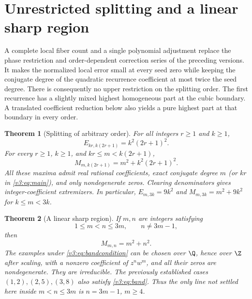 \documentclass[UTF8,11pt]{ctexart}
\newtheorem{thm}{Theorem}[section]
\theoremstyle{definition}
\numberwithin{equation}{section}
\begin{document}
\section{Unrestricted splitting and a linear sharp region}\label{v3:sec:universal}

A complete local fiber count and a single polynomial adjustment replace
the phase restriction and order-dependent correction series of the
preceding versions. It makes the normalized local error
small at every seed zero while keeping the conjugate degree of the
quadratic recurrence coefficient at most twice the seed degree.
There is consequently no upper restriction on the splitting order.
The first recurrence has a slightly mixed highest homogeneous part
at the cubic boundary. A translated coefficient reduction below
also yields a pure highest part at that boundary in every order.

\begin{thm}[Splitting of arbitrary order]\label{v3:thm:splitting}
For all integers $r\ge1$ and $k\ge1$,
\begin{equation}\label{v3:eq:main}
 E_{kr,k(2r+1)}=k^2(2r+1)^2.
\end{equation}
For every $r\ge1$, $k\ge1$, and $kr\le m<k(2r+1)$,
\begin{equation}\label{v4:eq:rectangle}
 M_{m,k(2r+1)}=m^2+k^2(2r+1)^2.
\end{equation}
All these maxima admit real rational coefficients, exact conjugate
degree $m$ (or $kr$ in \eqref{v3:eq:main}), and only nondegenerate zeros.
Clearing denominators gives integer-coefficient extremizers.
In particular, $E_{m,3k}=9k^2$ and $M_{m,3k}=m^2+9k^2$
for $k\le m<3k$.
\end{thm}

\begin{thm}[A linear sharp region]\label{v3:thm:band}
If $m,n$ are integers satisfying
\begin{equation}\label{v3:eq:bandcondition}
 1\le m<n\le3m,\qquad n\ne3m-1,
\end{equation}
then
\begin{equation}\label{v3:eq:band}
 M_{m,n}=m^2+n^2.
\end{equation}
The examples under \eqref{v3:eq:bandcondition} can be chosen over
$\Q$, hence over $\Z$ after scaling, with a nonzero coefficient of
$z^nw^m$, and all their zeros are nondegenerate. They are irreducible.
The previously established cases $(1,2),(2,5),(3,8)$ also satisfy
\eqref{v3:eq:band}. Thus the only line not settled here inside
$m<n\le3m$ is $n=3m-1$, $m\ge4$.
\end{thm}
\end{document}
